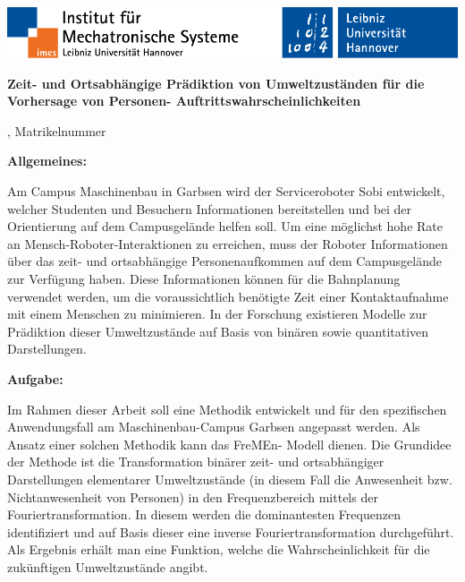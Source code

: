 \newpage
{}
     \begin{flushright}
          \vspace*{-20mm}
          \includegraphics[width=\textwidth]{Abbildungen/CoverLogos.pdf}
     \end{flushright}
\vspace*{10mm} %
{\let\clearpage\relax}\thispagestyle{empty}

\begin{spacing}{1}        
\begin{center}
\large\textbf{Zeit- und Ortsabhängige Prädiktion von Umweltzuständen für die Vorhersage von Personen- Auftrittswahrscheinlichkeiten}

\normalsize \Autor, Matrikelnummer \Matrikelnummer

\end{center}

\textbf{Allgemeines:}

Am Campus Maschinenbau in Garbsen wird der Serviceroboter Sobi entwickelt, welcher Studenten und Besuchern Informationen bereitstellen und bei der Orientierung auf dem Campusgelände helfen soll. Um eine möglichst hohe Rate an Mensch-Roboter-Interaktionen zu erreichen, muss der Roboter Informationen über das zeit- und ortsabhängige Personenaufkommen auf dem Campusgelände zur Verfügung haben. Diese Informationen können für die Bahnplanung verwendet werden, um die voraussichtlich benötigte Zeit einer Kontaktaufnahme mit einem Menschen zu minimieren. In der Forschung existieren Modelle zur Prädiktion dieser Umweltzustände auf Basis von binären sowie quantitativen Darstellungen.

\bigskip\textbf{Aufgabe:}

Im Rahmen dieser Arbeit soll eine Methodik entwickelt und für den spezifischen Anwendungsfall am Maschinenbau-Campus Garbsen angepasst werden. Als Ansatz einer solchen Methodik kann das FreMEn- Modell dienen. Die Grundidee der Methode ist die Transformation binärer zeit- und ortsabhängiger Darstellungen elementarer Umweltzustände (in diesem Fall die Anwesenheit bzw. Nichtanwesenheit von Personen) in den Frequenzbereich mittels der Fouriertransformation. In diesem werden die dominantesten Frequenzen identifiziert und auf Basis dieser eine inverse Fouriertransformation durchgeführt. Als Ergebnis erhält man eine Funktion, welche die Wahrscheinlichkeit für die zukünftigen Umweltzustände angibt. \\


\end{spacing}
